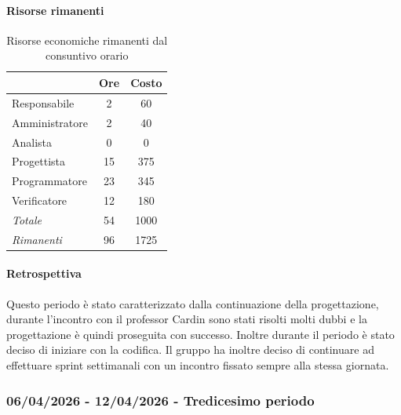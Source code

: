 \documentclass[a4paper,12pt]{article}
\begin{document}
            \paragraph{Risorse rimanenti}
                \begin{table}[H]
                \centering
                \caption{Risorse economiche rimanenti dal consuntivo orario}
                \begin{tabular}{|l|c|c|}
                \hline
                    \rowcolor{lightgray}{\textbf{Ruolo}} & {\textbf{Ore}} & {\textbf{Costo}}\\
                \hline
                    Responsabile & 2 & 60\\
                \hline
                    Amministratore & 2 & 40\\
                \hline
                    Analista & 0 & 0\\
                \hline
                    Progettista & 15 & 375\\
                \hline
                    Programmatore & 23 & 345\\
                \hline
                    Verificatore & 12 & 180\\
                \hline
                    \rowcolor{lightgray}\textit{Totale} & 54 & 1000\\
                \hline
                    \rowcolor{lightgray}\textit{Rimanenti} & 96 & 1725\\
                \hline
                \end{tabular}
                \end{table}
                
            \paragraph{Retrospettiva}
            Questo periodo è stato caratterizzato dalla continuazione della progettazione, durante l'incontro con il professor Cardin sono stati risolti molti dubbi e la progettazione è quindi proseguita con successo.
            Inoltre durante il periodo è stato deciso di iniziare con la codifica. Il gruppo ha inoltre deciso di continuare ad effettuare sprint settimanali con un incontro fissato sempre alla stessa giornata.

        \subsubsection{06/04/2026 - 12/04/2026 - Tredicesimo periodo}
\end{document}
